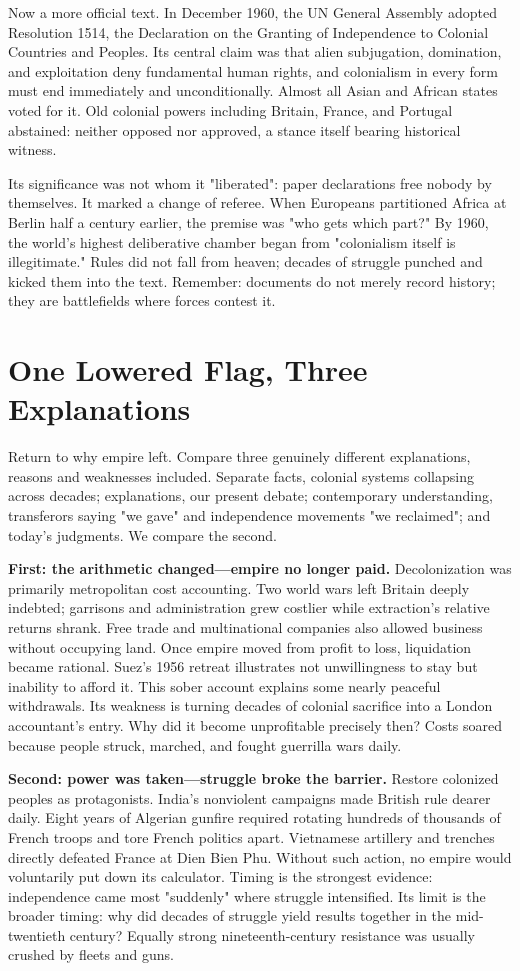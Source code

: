 Now a more official text. In December 1960, the UN General Assembly adopted Resolution 1514, the Declaration on the Granting of Independence to Colonial Countries and Peoples. Its central claim was that alien subjugation, domination, and exploitation deny fundamental human rights, and colonialism in every form must end immediately and unconditionally. Almost all Asian and African states voted for it. Old colonial powers including Britain, France, and Portugal abstained: neither opposed nor approved, a stance itself bearing historical witness.

Its significance was not whom it "liberated": paper declarations free nobody by themselves. It marked a change of referee. When Europeans partitioned Africa at Berlin half a century earlier, the premise was "who gets which part?" By 1960, the world's highest deliberative chamber began from "colonialism itself is illegitimate." Rules did not fall from heaven; decades of struggle punched and kicked them into the text. Remember: documents do not merely record history; they are battlefields where forces contest it.

\section{One Lowered Flag, Three Explanations}
Return to why empire left. Compare three genuinely different explanations, reasons and weaknesses included. Separate facts, colonial systems collapsing across decades; explanations, our present debate; contemporary understanding, transferors saying "we gave" and independence movements "we reclaimed"; and today's judgments. We compare the second.

\textbf{First: the arithmetic changed---empire no longer paid.} Decolonization was primarily metropolitan cost accounting. Two world wars left Britain deeply indebted; garrisons and administration grew costlier while extraction's relative returns shrank. Free trade and multinational companies also allowed business without occupying land. Once empire moved from profit to loss, liquidation became rational. Suez's 1956 retreat illustrates not unwillingness to stay but inability to afford it. This sober account explains some nearly peaceful withdrawals. Its weakness is turning decades of colonial sacrifice into a London accountant's entry. Why did it become unprofitable precisely then? Costs soared because people struck, marched, and fought guerrilla wars daily.

\textbf{Second: power was taken---struggle broke the barrier.} Restore colonized peoples as protagonists. India's nonviolent campaigns made British rule dearer daily. Eight years of Algerian gunfire required rotating hundreds of thousands of French troops and tore French politics apart. Vietnamese artillery and trenches directly defeated France at Dien Bien Phu. Without such action, no empire would voluntarily put down its calculator. Timing is the strongest evidence: independence came most "suddenly" where struggle intensified. Its limit is the broader timing: why did decades of struggle yield results together in the mid-twentieth century? Equally strong nineteenth-century resistance was usually crushed by fleets and guns.

